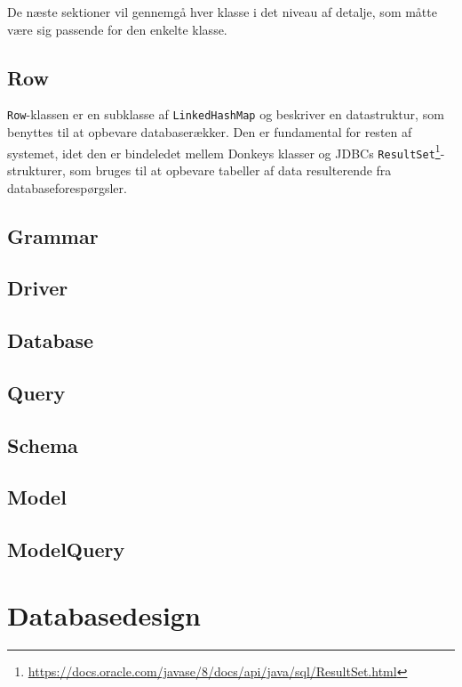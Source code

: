 De næste sektioner vil gennemgå hver klasse i det niveau af detalje, som måtte være sig passende for den enkelte klasse.

\subsection{Row}

\texttt{Row}-klassen er en subklasse af \texttt{LinkedHashMap} og beskriver en datastruktur, som benyttes til at opbevare databaserækker. Den er fundamental for resten af systemet, idet den er bindeledet mellem Donkeys klasser og JDBCs \texttt{ResultSet}\footnote{\url{https://docs.oracle.com/javase/8/docs/api/java/sql/ResultSet.html}}-strukturer, som bruges til at opbevare tabeller af data resulterende fra databaseforespørgsler.

\subsection{Grammar}

\subsection{Driver}

\subsection{Database}

\subsection{Query}

\subsection{Schema}

\subsection{Model}

\subsection{ModelQuery}

\section{Databasedesign}